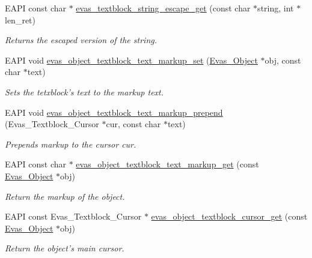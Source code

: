 \begin{DoxyCompactItemize}
EAPI const char $\ast$ \hyperlink{group__Evas__Object__Textblock_ga70b3680a8691c70bab39bd1c127424a5}{evas\_\-textblock\_\-string\_\-escape\_\-get} (const char $\ast$string, int $\ast$len\_\-ret)
\begin{DoxyCompactList}\small\item\em Returns the escaped version of the string. \item\end{DoxyCompactList}\item 
EAPI void \hyperlink{group__Evas__Object__Textblock_gadaed9758086de4545aa6fb561445816f}{evas\_\-object\_\-textblock\_\-text\_\-markup\_\-set} (\hyperlink{group__Evas__Object__Group_ga9e19e6dd1f517a0ba437c0114d3e7c97}{Evas\_\-Object} $\ast$obj, const char $\ast$text)
\begin{DoxyCompactList}\small\item\em Sets the tetxblock's text to the markup text. \item\end{DoxyCompactList}\item 
EAPI void \hyperlink{group__Evas__Object__Textblock_ga4f7a3b1ee59e3c07f35726773c576a8d}{evas\_\-object\_\-textblock\_\-text\_\-markup\_\-prepend} (Evas\_\-Textblock\_\-Cursor $\ast$cur, const char $\ast$text)
\begin{DoxyCompactList}\small\item\em Prepends markup to the cursor cur. \item\end{DoxyCompactList}\item 
EAPI const char $\ast$ \hyperlink{group__Evas__Object__Textblock_ga0896326ca8d9ca1dd194f322d0bc87b2}{evas\_\-object\_\-textblock\_\-text\_\-markup\_\-get} (const \hyperlink{group__Evas__Object__Group_ga9e19e6dd1f517a0ba437c0114d3e7c97}{Evas\_\-Object} $\ast$obj)
\begin{DoxyCompactList}\small\item\em Return the markup of the object. \item\end{DoxyCompactList}\item 
EAPI const Evas\_\-Textblock\_\-Cursor $\ast$ \hyperlink{group__Evas__Object__Textblock_ga2bbd5e4e1cc36e18790dc09fbd2a6c18}{evas\_\-object\_\-textblock\_\-cursor\_\-get} (const \hyperlink{group__Evas__Object__Group_ga9e19e6dd1f517a0ba437c0114d3e7c97}{Evas\_\-Object} $\ast$obj)
\begin{DoxyCompactList}\small\item\em Return the object's main cursor. \item\end{DoxyCompactList}\item 

\end{DoxyCompactItemize}
